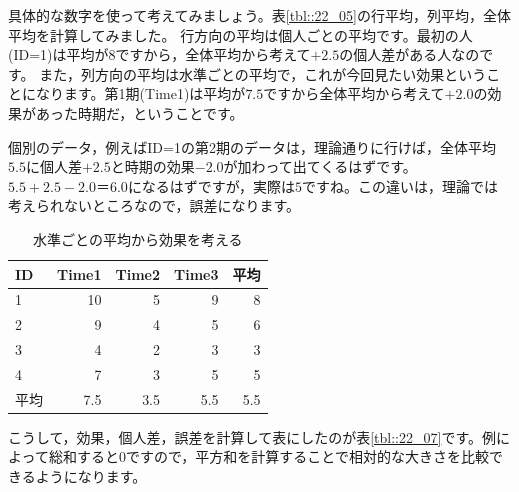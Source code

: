 \documentclass{ltjbook}
\begin{document}
具体的な数字を使って考えてみましょう。表\ref{tbl::22_05}の行平均，列平均，全体平均を計算してみました。
行方向の平均は個人ごとの平均です。最初の人(ID=1)は平均が$8$ですから，全体平均から考えて$+2.5$の個人差がある人なのです。
また，列方向の平均は水準ごとの平均で，これが今回見たい効果ということになります。第1期(Time1)は平均が$7.5$ですから全体平均から考えて$+2.0$の効果があった時期だ，ということです。

個別のデータ，例えばID=1の第2期のデータは，理論通りに行けば，全体平均$5.5$に個人差$+2.5$と時期の効果$-2.0$が加わって出てくるはずです。$5.5+2.5-2.0＝6.0$になるはずですが，実際は$5$ですね。この違いは，理論では考えられないところなので，誤差になります。
\begin{table}[ht]
  \centering
  \caption{水準ごとの平均から効果を考える} 
  \begin{tabular}{lrrr|r}
    \hline
  ID & Time1 & Time2 & Time3 & 平均\\ 
    \hline
  1 & 10 & 5 & 9 & 8\\ 
    2 & 9 & 4 & 5 & 6\\ 
    3 & 4 & 2 & 3 & 3\\ 
    4 & 7 & 3 & 5 & 5\\ 
     \hline
平均 & 7.5 & 3.5 &  5.5 &  5.5 \\\hline
  \end{tabular}
  \label{tbl::22_06}
  \end{table}
こうして，効果，個人差，誤差を計算して表にしたのが表\ref{tbl::22_07}です。例によって総和すると0ですので，平方和を計算することで相対的な大きさを比較できるようになります。
\end{document}
